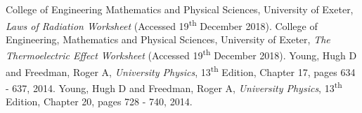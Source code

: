\documentclass{article}
\begin{document}
\newpage
\begin{thebibliography}{9}
 College of Engineering Mathematics and Physical Sciences, University of Exeter, \textit{Laws of Radiation Worksheet} (Accessed 19\textsuperscript{th} December 2018).
 College of Engineering, Mathematics and Physical Sciences, University of Exeter, \textit{The Thermoelectric Effect Worksheet} (Accessed 19\textsuperscript{th} December 2018).
 Young, Hugh D and Freedman, Roger A, \textit{University Physics}, 13\textsuperscript{th} Edition, Chapter 17, pages 634 - 637, 2014.
 Young, Hugh D and Freedman, Roger A, \textit{University Physics}, 13\textsuperscript{th} Edition, Chapter 20, pages 728 - 740, 2014.
\end{thebibliography}
\end{document}
